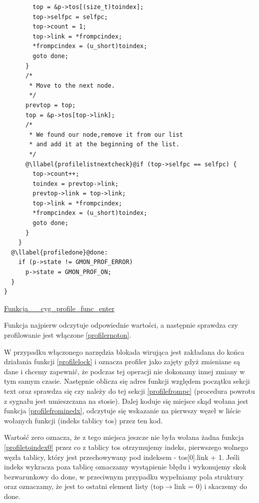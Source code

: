 \documentclass[shortabstract]{iithesis}
\makeatletter
\theoremstyle{definition} \newtheorem*{definition}{Definicja}
\theoremstyle{definition} \newtheorem*{example}{Przykład}
\theoremstyle{definition} \newtheorem*{remark}{Uwaga}
\newenvironment{longlisting}{\captionsetup{type=listing}}{}
\newcounter{llabel}[listing]%
\renewcommand*{\thellabel}{%
    \ifnum\value{llabel}<0 %
      \@ctrerr
    \else
      \ifnum\value{llabel}>10 %
        \@ctrerr
      \else
        \protect\ding{\the\numexpr\value{llabel}+201\relax}%
      \fi
    \fi
  }%
\newlength{\llabelsep}
\newcommand*{\llabel}[1]{%
  \begingroup
  \refstepcounter{llabel}%
  \label{#1}%
  \llap{\thellabel\kern\llabelsep}%
  \endgroup
}
\makeatother
\begin{document}
\begin{longlisting}
\begin{verbatim}
        top = &p->tos[(size_t)toindex];
        top->selfpc = selfpc;
        top->count = 1;
        top->link = *frompcindex;
        *frompcindex = (u_short)toindex;
        goto done;
      }
      /*
       * Move to the next node.
       */
      prevtop = top;
      top = &p->tos[top->link];
      /*
       * We found our node,remove it from our list
       * and add it at the beginning of the list.
       */
      @\llabel{profilelistnextcheck}@if (top->selfpc == selfpc) {
        top->count++;
        toindex = prevtop->link;
        prevtop->link = top->link;
        top->link = *frompcindex;
        *frompcindex = (u_short)toindex;
        goto done;
      }
    }
  @\llabel{profiledone}@done:
    if (p->state != GMON_PROF_ERROR)
      p->state = GMON_PROF_ON;
  }
}
\end{verbatim}
  \caption{\href{https://mimiker.ii.uni.wroc.pl/source/xref/mimiker/sys/kern/mcount.c?r=27b8c19a&mo=4721&fi=98\#98}{Funkcja \_\_cyg\_profile\_func\_enter}}
  \label{lst:funccygprofileenter}
\end{longlisting}

Funkcja najpierw odczytuje odpowiednie wartości, a następnie sprawdza czy profilowanie jest włączone \ref{profilernoton}.

W przypadku włączonego narzędzia blokada wirująca jest zakładana do końca działania funkcji \ref{profilelock} i oznacza profiler jako zajęty gdyż zmieniane są dane i chcemy zapewnić, że podczas tej operacji nie dokonamy innej zmiany w tym samym czasie. Następnie oblicza się adres funkcji względem początku sekcji text oraz sprawdza się  czy należy do tej sekcji \ref{profilefrompc} (procedura powrotu z sygnału jest umieszczana na stosie). Dalej koduje się miejsce skąd wołana jest funkcja \ref{profilefrominedx}, odczytuje się wskazanie na pierwszy węzeł w liście wołanych funkcji (indeks tablicy tos) przez ten kod. 

Wartość zero oznacza, że z tego miejsca jeszcze nie była wołana żadna funkcja \ref{profiletoindex0} przez co z tablicy tos otrzymujemy indeks, pierwszego wolnego węzła tablicy, który jest przechowywany pod indeksem - tos[0].link + 1. Jeśli indeks wykracza poza tablicę oznaczamy wystąpienie błędu i wykonujemy skok bezwarunkowy do done, w przeciwnym przypadku wypełniamy pola struktury oraz oznaczamy, że jest to ostatni element listy (top$\rightarrow$link = 0) i skaczemy do done.
\end{document}
